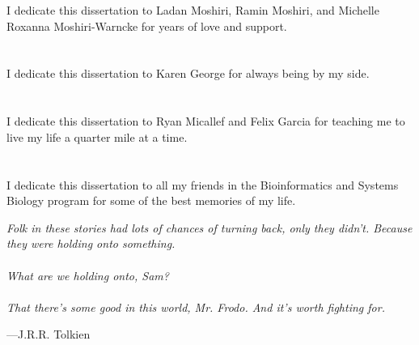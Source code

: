 \begin{frontmatter}
\makefrontmatter

\begin{dedication}
\vspace*{\fill}
I dedicate this dissertation to Ladan Moshiri, Ramin Moshiri, and Michelle Roxanna Moshiri-Warncke for years of love and support.
~\\~\\~\\
I dedicate this dissertation to Karen George for always being by my side.
~\\~\\~\\
I dedicate this dissertation to Ryan Micallef and Felix Garcia for teaching me to live my life a quarter mile at a time.
~\\~\\~\\
I dedicate this dissertation to all my friends in the Bioinformatics and Systems Biology program for some of the best memories of my life.
\vspace*{\fill}
\end{dedication}

\begin{epigraph}
\begin{center}
\begin{minipage}{0.65\linewidth}
\onehalfspacing
{\large
\textit{Folk in these stories had lots of chances of turning back, only they didn't. Because they were holding onto something.}\\
~\\
\textit{What are we holding onto, Sam?}\\
~\\
\textit{That there's some good in this world, Mr. Frodo. And it's worth fighting for.}
\begin{flushright}
---J.R.R. Tolkien
\end{flushright}
}
\end{minipage}
\end{center}
\end{epigraph}

\tableofcontents

\newpage
{}
\begin{center}\expandafter\MakeUppercase\expandafter{\abbrevtitle}\end{center}
\let\clearpage\relax
\vspace*{-2cm}
\printglossary[type=\acronymtype,title={}]


\end{frontmatter}
